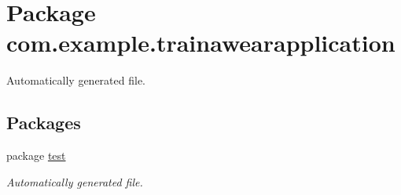 \hypertarget{namespacecom_1_1example_1_1trainawearapplication}{}\section{Package com.\+example.\+trainawearapplication}
\label{namespacecom_1_1example_1_1trainawearapplication}


Automatically generated file.  


\subsection*{Packages}
\begin{DoxyCompactItemize}
\item 
package \mbox{\hyperlink{namespacecom_1_1example_1_1trainawearapplication_1_1test}{test}}
\begin{DoxyCompactList}\small\item\em Automatically generated file. \end{DoxyCompactList}\end{DoxyCompactItemize}
